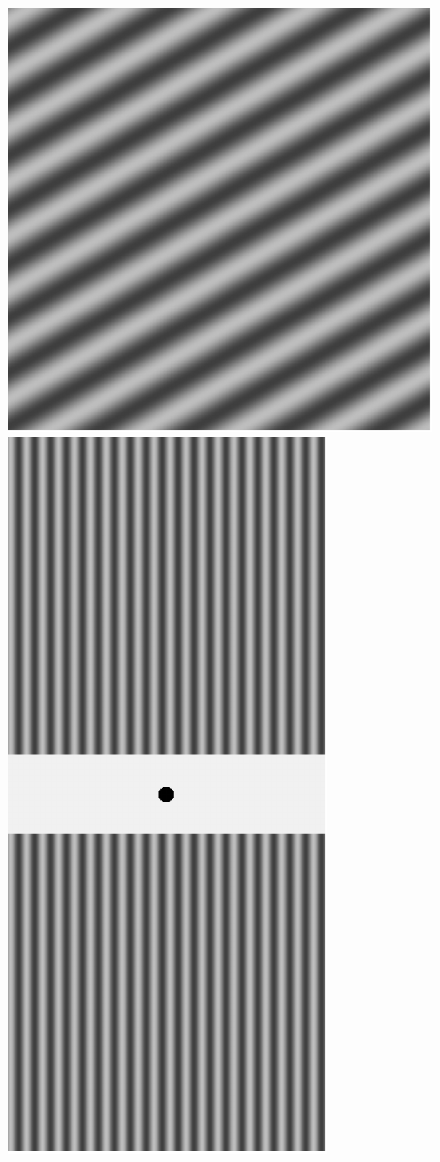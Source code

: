 \begin{figure}[h]
\begin{minipage}[b]{.19\textwidth}
        \includegraphics[keepaspectratio,width=\textwidth]{../../Figures/07_11_r60.pdf}
    \end{minipage}
    \begin{minipage}[b]{.19\textwidth}
        \centering
        \includegraphics[keepaspectratio,width=.6\textwidth]{../../Figures/07_21_dg90.pdf}

\end{minipage}
\end{figure}
